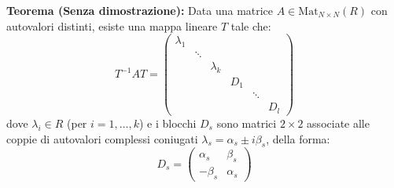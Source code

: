 \documentclass[openany]{book}
\theoremstyle{definition}
\theoremstyle{remark}
\begin{document}
\textbf{Teorema (Senza dimostrazione):} Data una matrice $A \in \text{Mat}_{N\times N}(R)$ con autovalori distinti, esiste una mappa lineare $T$ tale che:
\begin{equation}
    T^{-1} A T = 
    \begin{pmatrix}
        \lambda_1 & & & & & \\
        & \ddots & & & & \\
        & & \lambda_k & & & \\
        & & & D_1 & & \\
        & & & & \ddots & \\
        & & & & & D_l
    \end{pmatrix}
\end{equation}
dove $\lambda_i \in R$ (per $i=1,\dots,k$) e i blocchi $D_s$ sono matrici $2 \times 2$ associate alle coppie di autovalori complessi coniugati $\lambda_s = \alpha_s \pm i\beta_s$, della forma:
\begin{equation}
    D_s = \begin{pmatrix} \alpha_s & \beta_s \\ -\beta_s & \alpha_s \end{pmatrix}
\end{equation}
\end{document}

